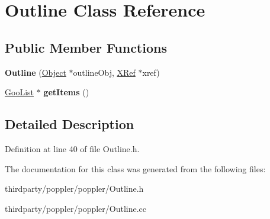 \hypertarget{class_outline}{}\section{Outline Class Reference}
\label{class_outline}
\subsection*{Public Member Functions}
\begin{DoxyCompactItemize}
\item 
\mbox{\label{class_outline_a747ff3ff528abac596b154bc0ea1ab1c}} 
{\bfseries Outline} (\hyperlink{class_object}{Object} $\ast$outline\+Obj, \hyperlink{class_x_ref}{X\+Ref} $\ast$xref)
\item 
\mbox{\label{class_outline_a11b4e058438a560a62cd600cd6afcf3c}} 
\hyperlink{class_goo_list}{Goo\+List} $\ast$ {\bfseries get\+Items} ()
\end{DoxyCompactItemize}


\subsection{Detailed Description}


Definition at line 40 of file Outline.\+h.



The documentation for this class was generated from the following files\+:\begin{DoxyCompactItemize}
\item 
thirdparty/poppler/poppler/Outline.\+h\item 
thirdparty/poppler/poppler/Outline.\+cc\end{DoxyCompactItemize}
